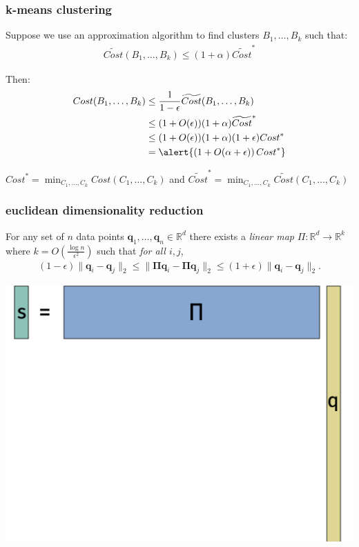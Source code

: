 \documentclass[compress]{beamer}
\newcommand{\bs}[1]{\boldsymbol{#1}}
\newcommand{\bv}[1]{\mathbf{#1}}
\newcommand{\R}{\mathbb{R}}
\begin{document}
\begin{frame}[t]
	\frametitle{k-means clustering}
	Suppose we use an approximation algorithm to find clusters $B_1, \ldots, B_k$ such that:
	\begin{align*}
		\widetilde{Cost}(B_1,\ldots, B_k) \leq (1+\alpha)\widetilde{Cost}^*
	\end{align*}
	
	Then: 
	\begin{align*}
		{Cost}(B_1,\ldots, B_k) &\leq \frac{1}{1-\epsilon}\widetilde{Cost}(B_1,\ldots, B_k) \\
		&\leq(1+O(\epsilon)) (1+\alpha)\widetilde{Cost}^*\\
		&\leq (1+O(\epsilon))(1+\alpha)(1+\epsilon){Cost}^*\\
		&= \alert{\left(1 + O(\alpha + \epsilon)\right){Cost}^*}
	\end{align*}

	\vspace{1em}
\begin{block}{\vspace*{-3ex}}
	\small ${Cost}^* = \min_{C_1, \ldots, C_k} Cost(C_1, \ldots, C_k)$ and $\widetilde{Cost}^* = \min_{C_1, \ldots, C_k} \widetilde{Cost}(C_1, \ldots, C_k) $
\end{block}
\end{frame}

\begin{frame}
	\frametitle{euclidean dimensionality reduction}
	\begin{lemma}
		For any set of $n$ data points $\bv{q}_1,\ldots, \bv{q}_n \in \R^d$ there exists a \emph{linear map} $\Pi: \R^d \rightarrow \R^k$ where $k = O\left(\frac{\log n}{\epsilon^2}\right)$ such that \emph{for all $i,j$},
		\begin{align*}
			(1-\epsilon)\|\bv{q}_i - \bv{q}_j\|_2 \leq \|\bs{\Pi}\bv{q}_i - \bs{\Pi}\bv{q}_j\|_2 \leq (1+\epsilon)\|\bv{q}_i - \bv{q}_j\|_2.
		\end{align*}
	\end{lemma}
	\begin{center}
		\includegraphics[height=.45\textheight]{jl_sketch.png}
	\end{center}
\end{frame}
\end{document}

